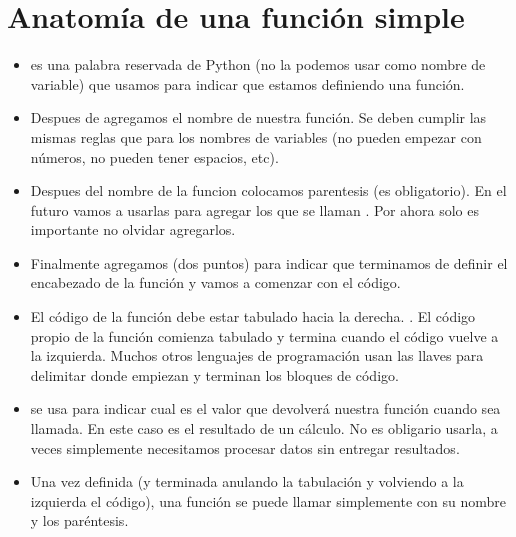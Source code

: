 \documentclass[a5paper,9pt,spanish]{sphinxmanual}
\begin{document}
\section{Anatomía de una función simple}
\label{\detokenize{fn:anatomia-de-una-funcion-simple}}\begin{itemize}
\item {} 
\sphinxAtStartPar
{} es una palabra reservada de Python (no la podemos usar como nombre de variable)
que usamos para indicar que estamos definiendo una función.

\item {} 
\sphinxAtStartPar
Despues de  agregamos el nombre de nuestra función. Se deben cumplir las mismas
reglas que para los nombres de variables (no pueden empezar con números, no pueden tener
espacios, etc).

\item {} 
\sphinxAtStartPar
Despues del nombre de la funcion colocamos parentesis (es obligatorio). En el futuro
vamos a usarlas para agregar los que se llaman . Por ahora solo es importante
no olvidar agregarlos.

\item {} 
\sphinxAtStartPar
Finalmente agregamos \sphinxstyleemphasis{:} (dos puntos) para indicar que terminamos de definir el encabezado
de la función y vamos a comenzar con el código.

\item {} 
\sphinxAtStartPar
El código de la función debe estar tabulado hacia la derecha. . El código propio de
la función comienza tabulado y termina cuando el código vuelve a la izquierda. Muchos otros
lenguajes de programación usan las llaves \sphinxcode{\sphinxupquote{\{\}}} para delimitar donde empiezan y terminan
los bloques de código.

\item {} 
\sphinxAtStartPar
{} se usa para indicar cual es el valor que devolverá nuestra función cuando sea
llamada. En este caso es el resultado de un cálculo. No es obligario usarla, a veces simplemente
necesitamos procesar datos sin entregar resultados.

\item {} 
\sphinxAtStartPar
Una vez definida (y terminada anulando la tabulación y volviendo a la izquierda el código),
una función se puede llamar simplemente con su nombre y los paréntesis.

\end{itemize}
\end{document}

